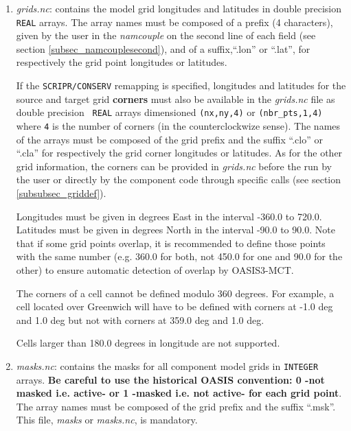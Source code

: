 \begin{enumerate}

\item {\em grids.nc}: contains the model grid longitudes and latitudes
  in double precision {\tt REAL} arrays. The array names must be
  composed of a prefix (4 characters), given by the user in the {\it
    namcouple} on the second line of each field (see section
  \ref{subsec_namcouplesecond}), and of a suffix,``.lon'' or ``.lat'', for respectively the grid point
  longitudes or latitudes.

  If the {\tt SCRIPR/CONSERV} remapping is specified, longitudes and
  latitudes for the source and target grid {\bf corners} must also be
  available in the {\em grids.nc} file as double precision {\tt
    REAL} arrays dimensioned {\tt (nx,ny,4)} or {\tt (nbr\_pts,1,4)}
  where {\tt 4} is the number of corners (in the counterclockwize
  sense). The names of the arrays must be composed of the grid prefix
  and the suffix ``.clo'' or ``.cla'' for respectively the grid corner
  longitudes or latitudes.  As for the other grid information, the
  corners can be provided in {\em grids.nc} before the run by the user
  or directly by the component code through specific calls (see section
  \ref{subsubsec_griddef}).

 
  Longitudes must be given in degrees East in the interval -360.0 to
  720.0. Latitudes must be given in degrees North in the interval
  -90.0 to 90.0. Note that if some grid points overlap, it is
  recommended to define those points with the same number (e.g. 360.0
  for both, not 450.0 for one and 90.0 for the other) to ensure
  automatic detection of overlap by OASIS3-MCT.
 
  The corners of a cell cannot be defined modulo 360 degrees. For
  example, a cell located over Greenwich will have to be defined with
  corners at -1.0 deg and 1.0 deg but not with corners at 359.0 deg
  and 1.0 deg.
 
  Cells larger than 180.0 degrees in longitude are not supported.
 
\item {\em masks.nc}: contains the masks for all component model grids
  in {\tt INTEGER} arrays. {\bf Be careful to use the historical
    OASIS convention: 0 -not masked i.e.  active- or 1 -masked
    i.e. not active- for each grid point}. The array names must be
  composed of the grid prefix and the suffix ``.msk''. This file, {\em
    masks} or {\em masks.nc}, is mandatory.


\end{enumerate}

